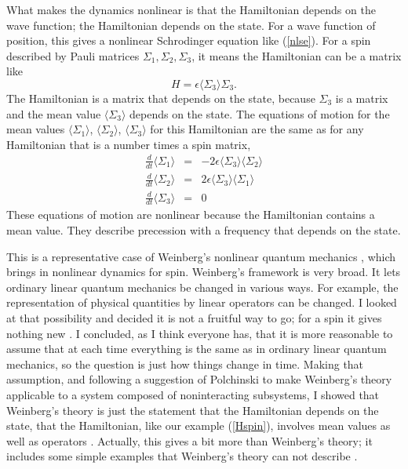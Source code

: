 \documentclass[pra, 12pt, showkeys, eqsecnum]{revtex4}
\begin{document}
What makes the dynamics nonlinear is that the Hamiltonian depends on the wave function; the Hamiltonian depends on the state. For a wave function of position, this gives a nonlinear Schrodinger equation like (\ref{nlse}). For a spin described by Pauli matrices $\Sigma_1 , \Sigma_2 , \Sigma_3 $, it means the Hamiltonian can be a matrix like
\begin{equation}
\label{Hspin}
H = \epsilon \langle \Sigma_3 \rangle \Sigma_3 .
\end{equation}
The Hamiltonian is a matrix that depends on the state, because $\Sigma_3 $ is a matrix and the mean value $\langle \Sigma_3 \rangle $ depends on the state. The equations of motion for the mean values $\langle \Sigma_1 \rangle $, $\langle \Sigma_2 \rangle $, $\langle \Sigma_3 \rangle $ for this Hamiltonian are the same as for any Hamiltonian that is a number times a spin matrix,
\begin{eqnarray}
\label{Eqspin}
\frac{d}{dt}\langle \Sigma_1 \rangle  & = & -2\epsilon \langle \Sigma_3 \rangle \langle \Sigma_2 \rangle \nonumber \\
\frac{d}{dt}\langle \Sigma_2 \rangle  & = & 2\epsilon \langle \Sigma_3 \rangle \langle \Sigma_1 \rangle \nonumber \\
\frac{d}{dt}\langle \Sigma_3 \rangle  & = & 0
\end{eqnarray}
These equations of motion are nonlinear because the Hamiltonian contains a mean value. They describe precession with a frequency that depends on the state.

This is a representative case of Weinberg's nonlinear quantum mechanics \cite{WeinbergNlqAnn,WeinbergNlqPrl}, which brings in nonlinear dynamics for spin. Weinberg's framework is very broad. It lets ordinary linear quantum mechanics be changed in various ways. For example, the representation of physical quantities by linear operators can be changed. I looked at that possibility and decided it is not a fruitful way to go; for a spin it gives nothing new \cite{me59}. I concluded, as I think everyone has, that it is more reasonable to assume that at each time everything is the same as in ordinary linear quantum mechanics, so the question is just how things change in time. Making that assumption, and following a suggestion of Polchinski\cite{Polchinski} to make Weinberg's theory applicable to a system composed of noninteracting subsystems, I showed that Weinberg's theory is just the statement that the Hamiltonian depends on the state, that the Hamiltonian, like our example (\ref{Hspin}),  involves mean values as well as operators \cite{me64,me66}. Actually, this gives a bit more than Weinberg's theory; it includes some simple examples that Weinberg's theory can not describe \cite{me66}.
\end{document}
